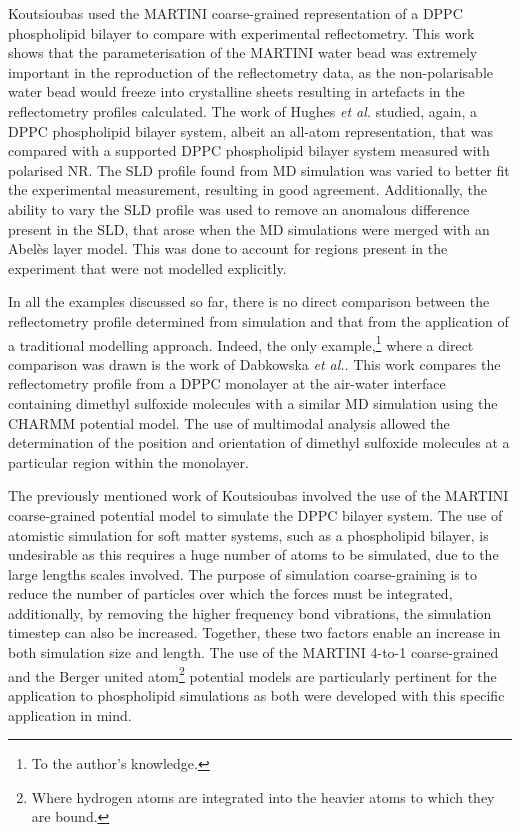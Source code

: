 Koutsioubas used the MARTINI coarse-grained representation of a DPPC phospholipid bilayer to compare with experimental reflectometry.\autocite{koutsioubas_combined_2016}
This work shows that the parameterisation of the MARTINI water bead was extremely important in the reproduction of the reflectometry data, as the non-polarisable water bead would freeze into crystalline sheets resulting in artefacts in the reflectometry profiles calculated.
The work of Hughes \emph{et al.} studied, again, a DPPC phospholipid bilayer system,\autocite{hughes_interpretation_2016} albeit an all-atom representation, that was compared with a supported DPPC phospholipid bilayer system measured with polarised NR.
The SLD profile found from MD simulation was varied to better fit the experimental measurement, resulting in good agreement.
Additionally, the ability to vary the SLD profile was used to remove an anomalous difference present in the SLD, that arose when the MD simulations were merged with an Abel\`{e}s layer model.
This was done to account for regions present in the experiment that were not modelled explicitly.

In all the examples discussed so far, there is no direct comparison between the reflectometry profile determined from simulation and that from the application of a traditional modelling approach.
Indeed, the only example,\footnote{To the author's knowledge.} where a direct comparison was drawn is the work of Dabkowska \emph{et al.}.\autocite{dabkowska_modulation_2014}
This work compares the reflectometry profile from a DPPC monolayer at the air-water interface containing dimethyl sulfoxide molecules with a similar MD simulation using the CHARMM potential model.
The use of multimodal analysis allowed the determination of the position and orientation of dimethyl sulfoxide molecules at a particular region within the monolayer.

The previously mentioned work of Koutsioubas involved the use of the MARTINI coarse-grained potential model to simulate the DPPC bilayer system.\autocite{koutsioubas_combined_2016}
The use of atomistic simulation for soft matter systems, such as a phospholipid bilayer, is undesirable as this requires a huge number of atoms to be simulated, due to the large lengths scales involved.
The purpose of simulation coarse-graining is to reduce the number of particles over which the forces must be integrated, additionally, by removing the higher frequency bond vibrations, the simulation timestep can also be increased.\autocite{pluhackova_biomembranes_2015}
Together, these two factors enable an increase in both simulation size and length.
The use of the MARTINI 4-to-1 coarse-grained and the Berger united atom\footnote{Where hydrogen atoms are integrated into the heavier atoms to which they are bound.} potential models are particularly pertinent for the application to phospholipid simulations as both were developed with this specific application in mind.\autocite{marrink_martini_2007,berger_molecular_1997}

